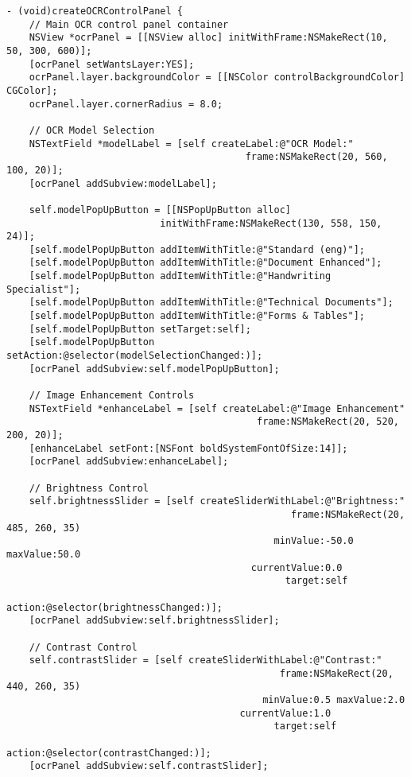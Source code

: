 \begin{verbatim}
- (void)createOCRControlPanel {
    // Main OCR control panel container
    NSView *ocrPanel = [[NSView alloc] initWithFrame:NSMakeRect(10, 50, 300, 600)];
    [ocrPanel setWantsLayer:YES];
    ocrPanel.layer.backgroundColor = [[NSColor controlBackgroundColor] CGColor];
    ocrPanel.layer.cornerRadius = 8.0;
    
    // OCR Model Selection
    NSTextField *modelLabel = [self createLabel:@"OCR Model:" 
                                          frame:NSMakeRect(20, 560, 100, 20)];
    [ocrPanel addSubview:modelLabel];
    
    self.modelPopUpButton = [[NSPopUpButton alloc] 
                           initWithFrame:NSMakeRect(130, 558, 150, 24)];
    [self.modelPopUpButton addItemWithTitle:@"Standard (eng)"];
    [self.modelPopUpButton addItemWithTitle:@"Document Enhanced"];
    [self.modelPopUpButton addItemWithTitle:@"Handwriting Specialist"];
    [self.modelPopUpButton addItemWithTitle:@"Technical Documents"];
    [self.modelPopUpButton addItemWithTitle:@"Forms & Tables"];
    [self.modelPopUpButton setTarget:self];
    [self.modelPopUpButton setAction:@selector(modelSelectionChanged:)];
    [ocrPanel addSubview:self.modelPopUpButton];
    
    // Image Enhancement Controls
    NSTextField *enhanceLabel = [self createLabel:@"Image Enhancement" 
                                            frame:NSMakeRect(20, 520, 200, 20)];
    [enhanceLabel setFont:[NSFont boldSystemFontOfSize:14]];
    [ocrPanel addSubview:enhanceLabel];
    
    // Brightness Control
    self.brightnessSlider = [self createSliderWithLabel:@"Brightness:" 
                                                  frame:NSMakeRect(20, 485, 260, 35)
                                               minValue:-50.0 maxValue:50.0 
                                           currentValue:0.0
                                                 target:self
                                                 action:@selector(brightnessChanged:)];
    [ocrPanel addSubview:self.brightnessSlider];
    
    // Contrast Control  
    self.contrastSlider = [self createSliderWithLabel:@"Contrast:" 
                                                frame:NSMakeRect(20, 440, 260, 35)
                                             minValue:0.5 maxValue:2.0 
                                         currentValue:1.0
                                               target:self
                                               action:@selector(contrastChanged:)];
    [ocrPanel addSubview:self.contrastSlider];
    

\end{verbatim}
